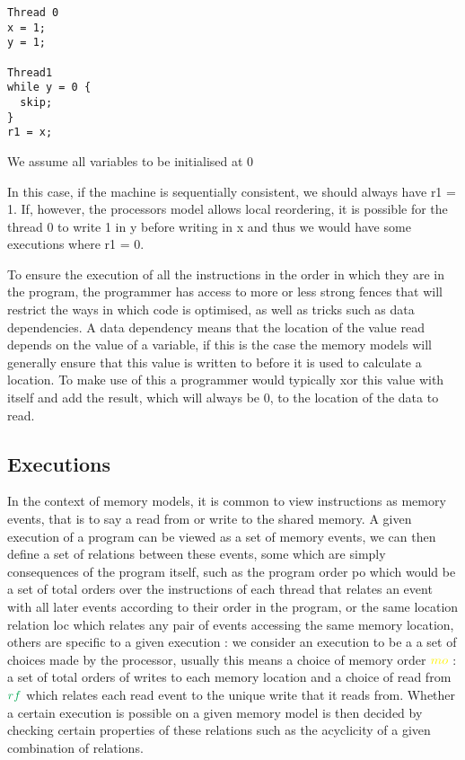 \documentclass[a4,12pt]{article}
\newcommand{\mo}{{\color{Yellow}mo}}
\newcommand{\rf}{{\color{Green}rf}}
\begin{document}
\begin{lstlisting}
Thread 0
x = 1;
y = 1;

Thread1
while y = 0 {
  skip;
}
r1 = x;
\end{lstlisting}

{\footnotesize{We assume all variables to be initialised at 0}}

In this case, if the machine is sequentially consistent, we should always have r1 = 1. If, however, the processors model allows local reordering, it is possible for the thread 0 to write 1 in y before writing in x and thus we would have some executions where r1 = 0.

To ensure the execution of all the instructions in the order in which they are in the program, the programmer has access to more or less strong fences that will restrict the ways in which code is optimised, as well as tricks such as data dependencies. A data dependency means that the location of the value read depends on the value of a variable, if this is the case the memory models will generally ensure that this value is written to before it is used to calculate a location. To make use of this a programmer would typically xor this value with itself and add the result, which will always be 0, to the location of the data to read.

\subsection{Executions}

In the context of memory models, it is common to view instructions as memory events, that is to say a read from or write to the shared memory. A given execution of a program can be viewed as a set of memory events, we can then define a set of relations between these events, some which are simply consequences of the program itself, such as the program order po which would be a set of total orders over the instructions of each thread that relates an event with all later events according to their order in the program, or the same location relation loc which relates any pair of events accessing the same memory location, others are specific to a given execution : we consider an execution to be a a set of choices made by the processor, usually this means a choice of memory order $\mo$ : a set of total orders of writes to each memory location and a choice of read from $\rf$ which relates each read event to the unique write that it reads from. Whether a certain execution is possible on a given memory model is then decided by checking certain properties of these relations such as the acyclicity of a given combination of relations.
\end{document}
